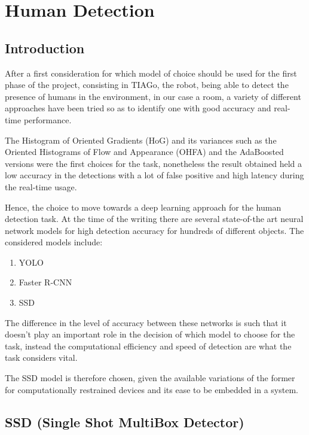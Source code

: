 \section{Human Detection}

\subsection{Introduction}

After a first consideration for which model of choice should be used for the first phase of the project, consisting in TIAGo, the robot, being able to detect the presence of humans in the environment, in our case a room, a variety of different approaches have been tried so as to identify one with good accuracy and real-time performance.

The Histogram of Oriented Gradients (HoG) and its variances such as the Oriented Histograms of Flow and Appearance (OHFA) and the AdaBoosted versions were the first choices for the task, nonetheless the result obtained held a low accuracy in the detections with a lot of false positive and high latency during the real-time usage.

Hence, the choice to move towards a deep learning approach for the human detection task. At the time of the writing there are several state-of-the art neural network models for high detection accuracy for hundreds of different objects. The considered models include:

\begin{enumerate}
  \item YOLO \cite{paper:YOLO}
  \item Faster R-CNN \cite{paper:FRCNN}
  \item SSD \cite{paper:SSD}
\end{enumerate}

The difference in the level of accuracy between these networks is such that it doesn't play an important role in the decision of which model to choose for the task, instead the computational efficiency and speed of detection are what the task considers vital.

The SSD model is therefore chosen, given the available variations of the former for computationally restrained devices and its ease to be embedded in a system.

\subsection{SSD (Single Shot MultiBox Detector)}

